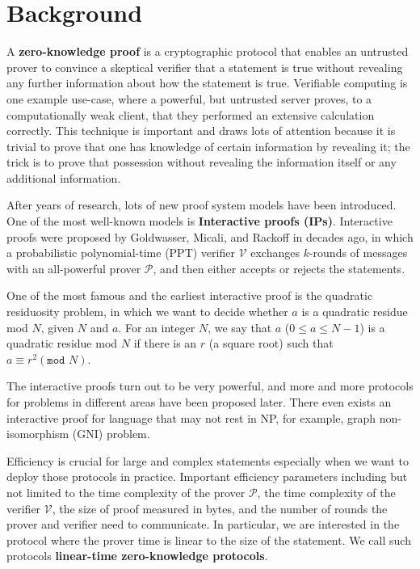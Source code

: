 \chapter{Background}


A \textbf{zero-knowledge proof} is a cryptographic protocol that enables an untrusted prover to convince a skeptical verifier that a statement is true without revealing any further information about how the statement is true. 
Verifiable computing is one example use-case, where a powerful, but untrusted server proves, to a computationally weak client, that they performed an extensive calculation correctly.
This technique is important and draws lots of attention because it is trivial to prove that one has knowledge of certain information by revealing it; the trick is to prove that possession without revealing the information itself or any additional information.


After years of research, lots of new proof system models have been introduced. 
One of the most well-known models is \textbf{Interactive proofs (IPs)}. Interactive proofs were proposed by Goldwasser, Micali, and Rackoff in \cite{DBLP:books/acm/19/GoldwasserMR19} decades ago, in which a probabilistic polynomial-time (PPT) verifier $\mathcal{V}$ exchanges $k$-rounds of messages with an all-powerful prover $\mathcal{P}$, and then either accepts or rejects the statements. 

One of the most famous and the earliest interactive proof is the quadratic residuosity problem, in which we want to decide whether $a$ is a quadratic residue mod $N$, given $N$ and $a$. For an integer $N$, we say that $a$ ($0 \le a \le N - 1$) is a quadratic residue mod $N$ if there is an $r$ (a square root) such that $ a \equiv r^2 ( \texttt{mod } N)$. 

The interactive proofs turn out to be very powerful, and more and more protocols for problems in different areas have been proposed later. There even exists an interactive proof for language that may not rest in NP, for example, graph non-isomorphism (GNI) problem.

Efficiency is crucial for large and complex statements especially when we want to deploy those protocols in practice. Important efficiency parameters including but not limited to the time complexity of the prover $\mathcal{P}$, the time complexity of the verifier $\mathcal{V}$, the size of proof measured in bytes, and the number of rounds the prover and verifier need to communicate. In particular, we are interested in the protocol where the prover time is linear to the size of the statement. We call such protocols \textbf{linear-time zero-knowledge protocols}.


